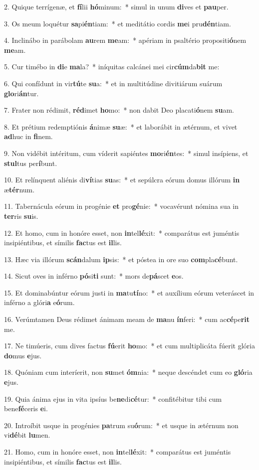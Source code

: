 2. Quique terrígenæ, et \textbf{fí}lii \textbf{hó}minum:~*  simul in unum \textbf{di}ves et \textbf{pau}per.\

3. Os meum loquétur \textbf{sa}pi\textbf{én}tiam:~*  et meditátio cordis \textbf{me}i pru\textbf{dén}tiam.\

4. Inclinábo in parábolam \textbf{au}rem \textbf{me}am:~*  apériam in psaltério propositi\textbf{ó}nem \textbf{me}am.\

5. Cur timébo in \textbf{di}e \textbf{ma}la?~*  iníquitas calcánei mei cir\textbf{cúm}da\textbf{bit} me:\

6. Qui confídunt in vir\textbf{tú}te \textbf{su}a:~*  et in multitúdine divitiárum suárum \textbf{glo}ri\textbf{án}tur.\

7. Frater non rédimit, \textbf{réd}imet \textbf{ho}mo:~*  non dabit Deo placati\textbf{ó}nem \textbf{su}am.\

8. Et prétium redemptiónis \textbf{á}nimæ \textbf{su}æ:~*  et laborábit in ætérnum, et vivet \textbf{ad}huc in \textbf{fi}nem.\

9. Non vidébit intéritum, cum víderit sapiéntes \textbf{mo}ri\textbf{én}tes:~*  simul insípiens, et \textbf{stul}tus per\textbf{í}bunt.\

10. Et relínquent aliénis di\textbf{ví}tias \textbf{su}as:~*  et sepúlcra eórum domus illórum \textbf{in} æ\textbf{tér}num.\

11. Tabernácula eórum in progénie \textbf{et} pro\textbf{gé}nie:~*  vocavérunt nómina sua in \textbf{ter}ris \textbf{su}is.\

12. Et homo, cum in honóre esset, non \textbf{in}tel\textbf{lé}xit:~*  comparátus est juméntis insipiéntibus, et símilis \textbf{fac}tus est \textbf{il}lis.\

13. Hæc via illórum \textbf{scán}dalum \textbf{ip}sis:~*  et póstea in ore suo \textbf{com}pla\textbf{cé}bunt.\

14. Sicut oves in inférno \textbf{pó}si\textbf{ti} sunt:~*  mors de\textbf{pá}scet \textbf{e}os.\

15. Et dominabúntur eórum justi in \textbf{ma}tu\textbf{tí}no:~*  et auxílium eórum veteráscet in inférno a glóri\textbf{a} e\textbf{ó}rum.\

16. Verúmtamen Deus rédimet ánimam meam de \textbf{ma}nu \textbf{ín}feri:~*  cum ac\textbf{cé}pe\textbf{rit} me.\

17. Ne timúeris, cum dives factus \textbf{fú}erit \textbf{ho}mo:~*  et cum multiplicáta fúerit glória \textbf{do}mus \textbf{e}jus.\

18. Quóniam cum interíerit, non \textbf{su}met \textbf{óm}nia:~*  neque descéndet cum eo \textbf{gló}ria \textbf{e}jus.\

19. Quia ánima ejus in vita ipsíus be\textbf{ne}di\textbf{cé}tur:~*  confitébitur tibi cum bene\textbf{fé}ceris \textbf{e}i.\

20. Introíbit usque in progénies \textbf{pa}trum su\textbf{ó}rum:~*  et usque in ætérnum non vi\textbf{dé}bit \textbf{lu}men.\

21. Homo, cum in honóre esset, non \textbf{in}tel\textbf{lé}xit:~*  comparátus est juméntis insipiéntibus, et símilis \textbf{fac}tus est \textbf{il}lis.\


